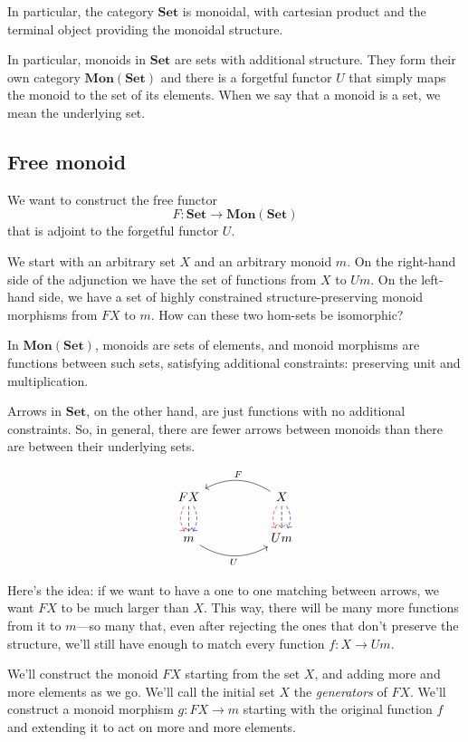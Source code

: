 \documentclass[DaoFP]{subfiles}
\begin{document}
In particular, the category $\mathbf{Set}$ is monoidal, with cartesian product and the terminal object providing the monoidal structure. 

In particular, monoids in $\mathbf{Set}$ are sets with additional structure. They form their own category $\mathbf{Mon}(\mathbf{Set})$ and there is a forgetful functor $U$ that simply maps the monoid to the set of its elements. When we say that a monoid is a set, we mean the underlying set.

\subsection{Free monoid}

We want to construct the free functor 
\[ F \colon \mathbf{Set} \to \mathbf{Mon}(\mathbf{Set})\]
that is adjoint to the forgetful functor $U$. 

We start with an arbitrary set $X$ and an arbitrary monoid $m$. On the right-hand side of the adjunction we have the set of functions from $X$ to $U m$. On the left-hand side, we have a set of highly constrained structure-preserving monoid morphisms from $F X$ to $m$. How can these two hom-sets be isomorphic?

In  $\mathbf{Mon}(\mathbf{Set})$, monoids are sets of elements, and monoid morphisms are functions between such sets, satisfying additional constraints: preserving unit and multiplication. 

Arrows in $\mathbf{Set}$, on the other hand, are just functions with no additional constraints. So, in general, there are fewer arrows between monoids than there are between their underlying sets. 

\[
 \begin{tikzcd}
F X
\arrow[d, bend right, red, dashed]
\arrow[d, dashed]
\arrow[d, bend left, blue, dashed]
  &&
X
\arrow[d, bend right, red, dashed]
\arrow[d, dashed]
\arrow[d, bend left, blue, dashed]
 \arrow[ll, bend right, "F"']
 \\
m
   \arrow[rr, bend right, "U"']
 &&
 U m
  \end{tikzcd}
\]

Here's the idea: if we want to have a one to one matching between arrows, we want $F X$ to be much larger than $X$. This way, there will be many more functions from it to $m$---so many that, even after rejecting the ones that don't preserve the structure, we'll still have enough to match every function $f \colon X \to U m$.

We'll construct the monoid $F X$ starting from the set $X$, and adding more and more elements as we go. We'll call the initial set $X$ the \emph{generators} of $F X$. We'll construct a monoid morphism $g \colon F X \to m$ starting with the original function $f$ and extending it to act on more and more elements.
\end{document}
